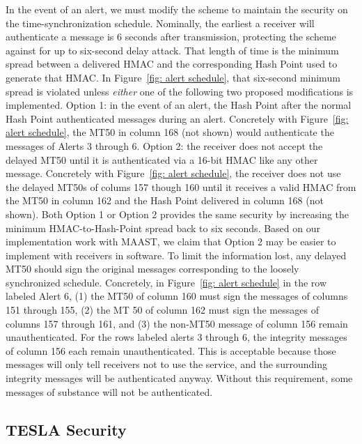 \documentclass[APA,STIX1COL]{IONjournal/ION-APA Template}
\begin{document}
			In the event of an alert, we must modify the scheme to maintain the security on the time-synchronization schedule.
			Nominally, the earliest a receiver will authenticate a message is 6 seconds after transmission, protecting the scheme against for up to six-second delay attack.
			That length of time is the minimum spread between a delivered HMAC and the corresponding Hash Point used to generate that HMAC.
			In Figure~\ref{fig: alert schedule}, that six-second minimum spread is violated unless {\em either} one of the following two proposed modifications is implemented.
			Option 1: in the event of an alert, the Hash Point after the normal Hash Point authenticated messages during an alert. 
			Concretely with Figure~\ref{fig: alert schedule}, the MT50 in column 168 (not shown) would authenticate the messages of Alerts 3 through 6.
			Option 2: the receiver does not accept the delayed MT50 until it is authenticated via a 16-bit HMAC like any other message.
			Concretely with Figure~\ref{fig: alert schedule}, the receiver does not use the delayed MT50s of colums 157 though 160 until it receives a valid HMAC from the MT50 in column 162 and the Hash Point delivered in column 168 (not shown).
			Both Option 1 or Option 2 provides the same security by increasing the minimum HMAC-to-Hash-Point spread back to six seconds.
			Based on our implementation work with MAAST, we claim that Option 2 may be easier to implement with receivers in software.
			To limit the information lost, any delayed MT50 should sign the original messages corresponding to the loosely synchronized schedule.
			Concretely, in Figure~\ref{fig: alert schedule} in the row labeled Alert 6, (1) the MT50 of column 160 must sign the messages of columns 151 through 155, (2) the MT 50 of column 162 must sign the messages of columns 157 through 161, and (3) the non-MT50 message of column 156 remain unauthenticated.
			For the rows labeled alerts 3 through 6, the integrity messages of column 156 each remain unauthenticated.
			This is acceptable because those messages will only tell receivers not to use the service, and the surrounding integrity messages will be authenticated anyway.
			Without this requirement, some messages of substance will not be authenticated.

	\subsection{TESLA Security} \label{sub:tesla_security}
\end{document}
